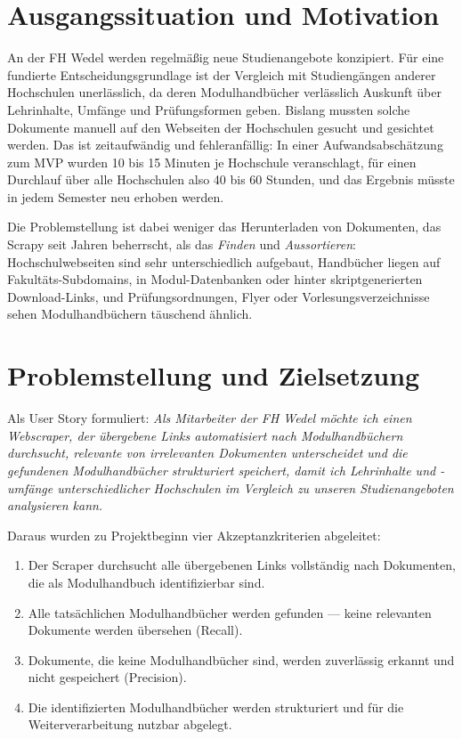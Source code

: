 \section{Ausgangssituation und Motivation}
An der FH Wedel werden regelmäßig neue Studienangebote konzipiert. Für eine fundierte Entscheidungsgrundlage ist der Vergleich mit Studiengängen anderer Hochschulen unerlässlich, da deren Modulhandbücher verlässlich Auskunft über Lehrinhalte, Umfänge und Prüfungsformen geben. Bislang mussten solche Dokumente manuell auf den Webseiten der Hochschulen gesucht und gesichtet werden. Das ist zeitaufwändig und fehleranfällig: In einer Aufwandsabschätzung zum MVP wurden 10 bis 15 Minuten je Hochschule veranschlagt, für einen Durchlauf über alle Hochschulen also 40 bis 60 Stunden, und das Ergebnis müsste in jedem Semester neu erhoben werden.

Die Problemstellung ist dabei weniger das Herunterladen von Dokumenten, das Scrapy seit Jahren beherrscht, als das \emph{Finden} und \emph{Aussortieren}: Hochschulwebseiten sind sehr unterschiedlich aufgebaut, Handbücher liegen auf Fakultäts-Subdomains, in Modul-Datenbanken oder hinter skriptgenerierten Download-Links, und Prüfungsordnungen, Flyer oder Vorlesungsverzeichnisse sehen Modulhandbüchern täuschend ähnlich.

\section{Problemstellung und Zielsetzung}
Als User Story formuliert: \emph{Als Mitarbeiter der FH Wedel möchte ich einen Webscraper, der übergebene Links automatisiert nach Modulhandbüchern durchsucht, relevante von irrelevanten Dokumenten unterscheidet und die gefundenen Modulhandbücher strukturiert speichert, damit ich Lehrinhalte und -umfänge unterschiedlicher Hochschulen im Vergleich zu unseren Studienangeboten analysieren kann.}

Daraus wurden zu Projektbeginn vier Akzeptanzkriterien abgeleitet:
\begin{enumerate}[label=\textbf{A\arabic*}]
  \item Der Scraper durchsucht alle übergebenen Links vollständig nach Dokumenten, die als Modulhandbuch identifizierbar sind.
  \item Alle tatsächlichen Modulhandbücher werden gefunden --- keine relevanten Dokumente werden übersehen (Recall).
  \item Dokumente, die keine Modulhandbücher sind, werden zuverlässig erkannt und nicht gespeichert (Precision).
  \item Die identifizierten Modulhandbücher werden strukturiert und für die Weiterverarbeitung nutzbar abgelegt.
\end{enumerate}

